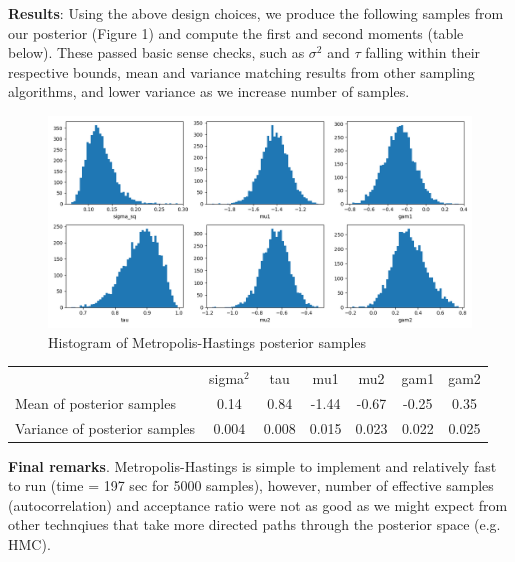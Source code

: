 \documentclass[12pt,letterpaper,twoside]{article}
\begin{document}
\textbf{Results}: Using the above design choices, we produce the following 
samples from our posterior (Figure 1) and compute the first and second 
moments (table below). These passed basic sense checks, such as $\sigma^2$ 
and $\tau$ falling within their respective bounds, mean and variance matching 
results from other sampling algorithms, and lower variance as we increase number 
of samples.
\begin{figure}[H]
    \centering
    \includegraphics[scale=0.55]{images/histogram.png}
    \vspace*{-10mm}
    \caption{Histogram of Metropolis-Hastings posterior samples}
\end{figure}

\begin{table}[H]
    \begin{tabular}{lcccccc}
    \multicolumn{1}{c}{}          & sigma$^2$ & tau   & mu1   & mu2   & gam1  & gam2  \\
    Mean of posterior samples     & 0.14  & 0.84  & -1.44 & -0.67 & -0.25 & 0.35  \\
    Variance of posterior samples & 0.004 & 0.008 & 0.015 & 0.023 & 0.022 & 0.025
    \end{tabular}
\end{table}

\textbf{Final remarks}. Metropolis-Hastings is simple to implement 
and relatively fast to run (time = 197 sec for 5000 samples), however,
number of effective samples (autocorrelation) and acceptance ratio 
were not as good as we might expect from other technqiues that take 
more directed paths through the posterior space (e.g. HMC).   
\end{document}
